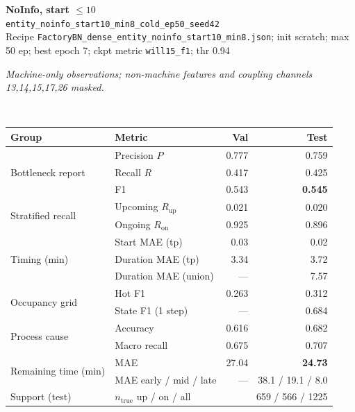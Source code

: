 \documentclass[9pt,a4paper,twocolumn]{extarticle}
\begin{document}
\noindent\begin{minipage}{\columnwidth}
\begin{center}
{\small\bfseries NoInfo, start $\le 10$}\\
{\scriptsize\texttt{entity\_noinfo\_start10\_min8\_cold\_ep50\_seed42}}\\
{\scriptsize Recipe \texttt{FactoryBN\_dense\_entity\_noinfo\_start10\_min8.json}; init scratch; max 50 ep; best epoch 7; ckpt metric \texttt{will15\_f1}; thr 0.94}\\[1pt]
\parbox{0.96\columnwidth}{\scriptsize\itshape Machine-only observations; non-machine features and coupling channels 13,14,15,17,26 masked.}\\[2pt]
\scriptsize\setlength{\tabcolsep}{3pt}
\begin{tabular}{llrr}
\toprule
Group & Metric & Val & Test \\
\midrule
\multirow{3}{*}{Bottleneck report}
  & Precision $P$ & 0.777 & 0.759 \\
  & Recall $R$ & 0.417 & 0.425 \\
  & F1 & 0.543 & \textbf{0.545} \\
\midrule
\multirow{2}{*}{Stratified recall}
  & Upcoming $R_{\mathrm{up}}$ & 0.021 & 0.020 \\
  & Ongoing $R_{\mathrm{on}}$ & 0.925 & 0.896 \\
\midrule
\multirow{3}{*}{Timing (min)}
  & Start MAE (tp) & 0.03 & 0.02 \\
  & Duration MAE (tp) & 3.34 & 3.72 \\
  & Duration MAE (union) & --- & 7.57 \\
\midrule
\multirow{2}{*}{Occupancy grid}
  & Hot F1 & 0.263 & 0.312 \\
  & State F1 (1 step) & --- & 0.684 \\
\midrule
\multirow{2}{*}{Process cause}
  & Accuracy & 0.616 & 0.682 \\
  & Macro recall & 0.675 & 0.707 \\
\midrule
\multirow{2}{*}{Remaining time (min)}
  & MAE & 27.04 & \textbf{24.73} \\
  & MAE early / mid / late & --- & 38.1 / 19.1 / 8.0 \\
\midrule
Support (test)
  & $n_{\mathrm{true}}$ up / on / all & \multicolumn{2}{r}{659 / 566 / 1225} \\
\bottomrule
\end{tabular}
\end{center}
\end{minipage}\par\vspace{6pt}
\end{document}
